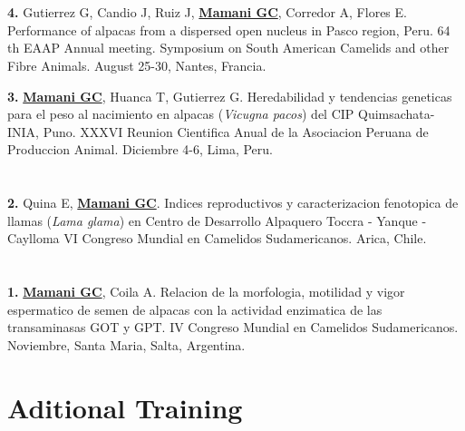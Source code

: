 \documentclass[margin,line,10pt]{res}
\newenvironment{list1}{
  \begin{list}{\ding{113}}{%
      \setlength{\itemsep}{0in}
      \setlength{\parsep}{0in} \setlength{\parskip}{0in}
      \setlength{\topsep}{0in} \setlength{\partopsep}{0in} 
      \setlength{\leftmargin}{0.17in}}}{\end{list}}
\begin{document}
\begin{resume}
\section{}
\begin{list1}
\item [\bf{4}.] Gutierrez G, Candio J, Ruiz J, {\bf \underline{Mamani GC}}, Corredor A, Flores E.
Performance of alpacas from a dispersed open nucleus in Pasco region, Peru.
64 th EAAP Annual meeting. Symposium on South American Camelids and other Fibre Animals. August 25-30, Nantes, Francia. 
\vspace{0.5cm}

\item [\bf{3}.] {\bf \underline{Mamani GC}}, Huanca T, Gutierrez G.
Heredabilidad y tendencias geneticas para el peso al nacimiento en alpacas (\textit{Vicugna pacos}) del CIP Quimsachata-INIA, Puno.
XXXVI Reunion Cientifica Anual de la Asociacion Peruana de Produccion Animal. Diciembre 4-6, Lima, Peru. 
\end{list1}
\vspace{0.5cm}

\section{}
\begin{list1}
\item [\bf{2}.] Quina E, {\bf \underline{Mamani GC}}.
Indices reproductivos y caracterizacion fenotopica de llamas (\textit{Lama glama}) en Centro de Desarrollo Alpaquero Toccra - Yanque -Caylloma
VI Congreso Mundial en Camelidos Sudamericanos. Arica, Chile. 
\end{list1}
\vspace{0.5cm}

\section{}
\begin{list1}
\item [\bf{1}.] {\bf \underline{Mamani GC}}, Coila A.
Relacion de la morfologia, motilidad y vigor espermatico de semen de alpacas con la actividad enzimatica de las transaminasas GOT y GPT.
IV Congreso Mundial en Camelidos Sudamericanos. Noviembre, Santa Maria, Salta, Argentina. 
\end{list1}

\vspace{0.9cm}
\section{\sc Aditional Training} 
\vspace{2cm}


\end{resume}
\end{document}
